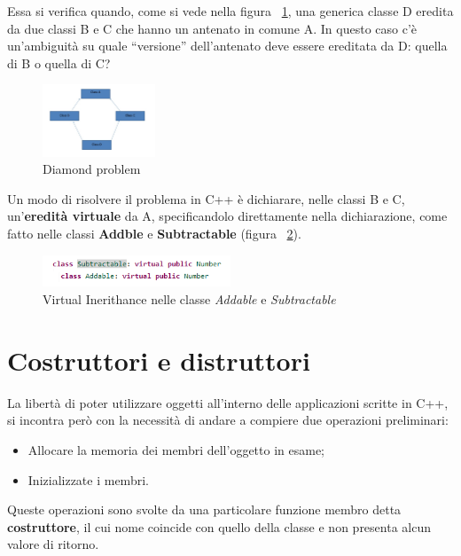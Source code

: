 Essa si verifica quando, come si vede nella figura ~\ref{fig:DiamondProblem}, una generica classe D eredita da due classi B e C che hanno un antenato in comune A. In questo caso c'è un'ambiguità su quale “versione” dell'antenato deve essere ereditata da D: quella di B o quella di C?

\begin{figure}[h]
	\centering
	\includegraphics[width=0.3\textwidth]{Immagini/DiamondProblem.png}
	\caption{Diamond problem}
	\label{fig:DiamondProblem}
\end{figure}

Un modo di risolvere il problema in C++ è dichiarare, nelle classi B e C, un'\textbf{eredità virtuale} da A, specificandolo direttamente nella dichiarazione, come fatto nelle classi \textbf{Addble} e \textbf{Subtractable} (figura ~\ref{fig:VirtualInerithance}).

\begin{figure}[h]
	\centering
	\includegraphics[width=0.5\textwidth]{Immagini/VirtualInerithance.png}
	\caption{Virtual Inerithance nelle classe \textit{Addable} e \textit{Subtractable}}
	\label{fig:VirtualInerithance}
\end{figure}

\section{Costruttori e distruttori}
La libertà di poter utilizzare oggetti all'interno delle applicazioni scritte in C++, si incontra però con la necessità di andare a compiere due operazioni preliminari:
\begin{itemize}
	\item Allocare la memoria dei membri dell'oggetto in esame;
	\item Inizializzate i membri.
\end{itemize}
Queste operazioni sono svolte da una particolare funzione membro detta \textbf{costruttore}, il cui nome coincide con quello della classe e non presenta alcun valore di ritorno.

